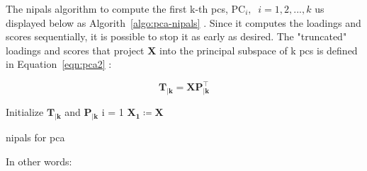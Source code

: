The \acrshort{nipals} algorithm to compute the first k-th \acrshort{pc}s, $\text{PC}_i ,\;\; i =1,2,...,k$ us displayed below as Algorith~\ref{algo:pca-nipals} \parencite{dunn2021pid} \parencite{ng2013} \parencite{nipals2017}. Since it computes the loadings and scores sequentially, it is possible to stop it as early as desired. The "truncated" loadings and scores that project $\mathbf{X}$ into the principal subspace of k \acrshort{pc}s is defined in Equation~\ref{eqn:pca2} :

\begin{equation}
	\label{eqn:pca2}
	\mathbf{T_{|k}=XP_{|k}^\intercal}
\end{equation}

\begin{algorithm}[H]
	\DontPrintSemicolon
	\label{algo:pca-nipals}
	\SetAlgoLined
	Initialize $\mathbf{T_{|k}}$ and $\mathbf{P_{|k}}$\;
	i = 1\;
	$\mathbf{X_1 \coloneqq X}$\;
	
	
	\caption{\acrfull{nipals} for \acrshort{pca}}
\end{algorithm}

In other words:

